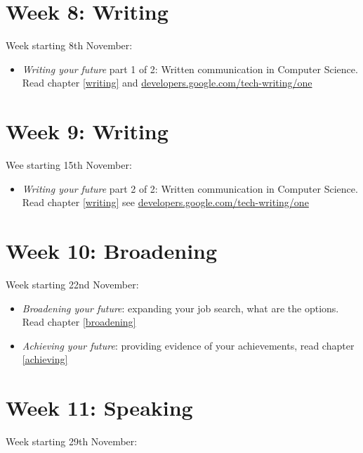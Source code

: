 \documentclass[
]{book}
\providecommand{\tightlist}{%
  \setlength{\itemsep}{0pt}\setlength{\parskip}{0pt}}
\begin{document}
\hypertarget{week8}{%
\section{Week 8: Writing}\label{week8}}

Week starting 8th November:

\begin{itemize}
\tightlist
\item
  \emph{Writing your future} part 1 of 2: Written communication in Computer Science. Read chapter \ref{writing} and \href{https://developers.google.com/tech-writing/one}{developers.google.com/tech-writing/one}
\end{itemize}

\hypertarget{week9}{%
\section{Week 9: Writing}\label{week9}}

Wee starting 15th November:

\begin{itemize}
\tightlist
\item
  \emph{Writing your future} part 2 of 2: Written communication in Computer Science. Read chapter \ref{writing} see \href{https://developers.google.com/tech-writing/one}{developers.google.com/tech-writing/one}
\end{itemize}

\hypertarget{week10}{%
\section{Week 10: Broadening}\label{week10}}

Week starting 22nd November:

\begin{itemize}
\tightlist
\item
  \emph{Broadening your future}: expanding your job search, what are the options. Read chapter \ref{broadening}
\item
  \emph{Achieving your future}: providing evidence of your achievements, read chapter \ref{achieving}
\end{itemize}

\hypertarget{week11}{%
\section{Week 11: Speaking}\label{week11}}

Week starting 29th November:
\end{document}
